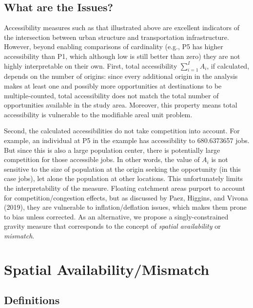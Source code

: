 \documentclass[]{elsarticle} %
\begin{document}
\hypertarget{what-are-the-issues}{%
\subsection{What are the Issues?}\label{what-are-the-issues}}

Accessibility measures such as that illustrated above are excellent
indicators of the intersection between urban structure and
transportation infrastructure. However, beyond enabling comparisons of
cardinality (e.g., P5 has higher accessibility than P1, which although
low is still better than zero) they are not highly interpretable on
their own. First, total accessibility \(\sum_{i=1}^IA_i\), if
calculated, depends on the number of origins: since every additional
origin in the analysis makes at least one and possibly more
opportunities at destinations to be multiple-counted, total
accessibility does not match the total number of opportunities available
in the study area. Moreover, this property means total accessibility is
vulnerable to the modifiable areal unit problem.

Second, the calculated accessibilities do not take competition into
account. For example, an individual at P5 in the example has
accessibility to 680.6373657 jobs. But since this is also a large
population center, there is potentially large competition for those
accessible jobs. In other words, the value of \(A_i\) is not sensitive
to the size of population at the origin seeking the opportunity (in this
case jobs), let alone the population at other locations. This
unfortunately limits the interpretability of the measure. Floating
catchment areas purport to account for competition/congestion effects,
but as discussed by Paez, Higgins, and Vivona (2019), they are
vulnerable to inflation/deflation issues, which makes them prone to bias
unless corrected. As an alternative, we propose a singly-constrained
gravity measure that corresponds to the concept of \emph{spatial
availability} or \emph{mismatch}.

\hypertarget{spatial-availabilitymismatch}{%
\section{Spatial
Availability/Mismatch}\label{spatial-availabilitymismatch}}

\hypertarget{definitions}{%
\subsection{Definitions}\label{definitions}}
\end{document}
